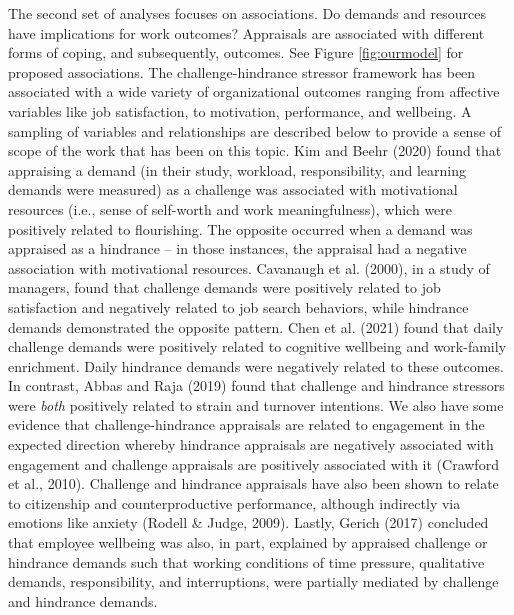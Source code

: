 \documentclass[
  jou,mask]{apa6}
\begin{document}
The second set of analyses focuses on associations. Do demands and resources have implications for work outcomes? Appraisals are associated with different forms of coping, and subsequently, outcomes. See Figure \ref{fig:ourmodel} for proposed associations. The challenge-hindrance stressor framework has been associated with a wide variety of organizational outcomes ranging from affective variables like job satisfaction, to motivation, performance, and wellbeing. A sampling of variables and relationships are described below to provide a sense of scope of the work that has been on this topic. Kim and Beehr (2020) found that appraising a demand (in their study, workload, responsibility, and learning demands were measured) as a challenge was associated with motivational resources (i.e., sense of self-worth and work meaningfulness), which were positively related to flourishing. The opposite occurred when a demand was appraised as a hindrance -- in those instances, the appraisal had a negative association with motivational resources. Cavanaugh et al. (2000), in a study of managers, found that challenge demands were positively related to job satisfaction and negatively related to job search behaviors, while hindrance demands demonstrated the opposite pattern. Chen et al. (2021) found that daily challenge demands were positively related to cognitive wellbeing and work-family enrichment. Daily hindrance demands were negatively related to these outcomes. In contrast, Abbas and Raja (2019) found that challenge and hindrance stressors were \emph{both} positively related to strain and turnover intentions. We also have some evidence that challenge-hindrance appraisals are related to engagement in the expected direction whereby hindrance appraisals are negatively associated with engagement and challenge appraisals are positively associated with it (Crawford et al., 2010). Challenge and hindrance appraisals have also been shown to relate to citizenship and counterproductive performance, although indirectly via emotions like anxiety (Rodell \& Judge, 2009). Lastly, Gerich (2017) concluded that employee wellbeing was also, in part, explained by appraised challenge or hindrance demands such that working conditions of time pressure, qualitative demands, responsibility, and interruptions, were partially mediated by challenge and hindrance demands.
\end{document}
